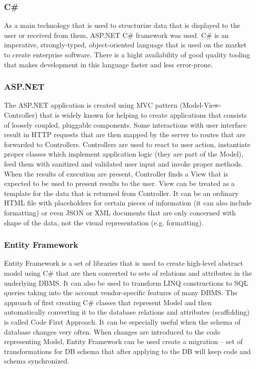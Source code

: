 \documentclass[12pt, twoside, openany]{report}
\theoremstyle{definition}
\begin{document}
\subsubsection{C\#}
As a main technology that is used to structurize data that is displayed to the user or received from them, ASP.NET C\# framework was used.
C\# is an imperative, strongly-typed, object-oriented language that is used on the market to create enterprise software. There is a hight availability of good quality tooling that makes development in this language faster and less error-prone.

\subsubsection{ASP.NET}
The ASP.NET application is created using MVC pattern (Model-View-Controller) that is widely known for helping to create applications that consists of loosely coupled, pluggable components. Some interactions with user interface result in HTTP requests that are then mapped by the server to routes that are forwarded to Controllers. Controllers are used to react to user action, instantiate proper classes which implement application logic (they are part of the Model), feed them with sanitized and validated user input and invoke proper methods. When the results of execution are present, Controller finds a View that is expected to be used to present results to the user. View can be treated as a template for the data that is returned from Controller. It can be an ordinary HTML file with placeholders for certain pieces of information (it can also include formatting) or even JSON or XML documents that are only concerned with shape of the data, not the visual representation (e.g. formatting).

\subsubsection{Entity Framework}
Entity Framework is a set of libraries that is used to create high-level abstract model using C\# that are then converted to sets of relations and attributes in the underlying DBMS. It can also be used to transform LINQ constructions to SQL queries taking into the account vendor-specific features of many DBMS.
The approach of first creating C\# classes that represent Model and then automatically converting it to the database relations and attributes (scaffolding) is called Code First Approach. It can be especially useful when the schema of database changes very often. When changes are introduced to the code representing Model, Entity Framework can be used create a migration  -- set of transformations for DB schema that after applying to the DB will keep code and schema synchronized. 
\end{document}
